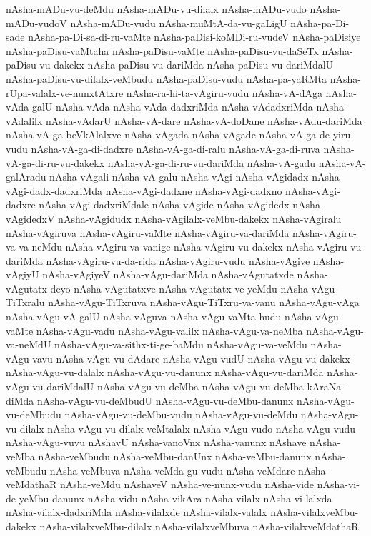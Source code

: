 {nAsha-mADu-vu-deMdu
nAsha-mADu-vu-dilalx
nAsha-mADu-vudo
nAsha-mADu-vudoV
nAsha-mADu-vudu
nAsha-muMtA-da-vu-gaLigU
nAsha-pa-Di-sade
nAsha-pa-Di-sa-di-ru-vaMte
nAsha-paDisi-koMDi-ru-vudeV
nAsha-paDisiye
nAsha-paDisu-vaMtaha
nAsha-paDisu-vaMte
nAsha-paDisu-vu-daSeTx
nAsha-paDisu-vu-dakekx
nAsha-paDisu-vu-dariMda
nAsha-paDisu-vu-dariMdalU
nAsha-paDisu-vu-dilalx-veMbudu
nAsha-paDisu-vudu
nAsha-pa-yaRMta
nAsha-rUpa-valalx-ve-nunxtAtxre
nAsha-ra-hi-ta-vAgiru-vudu
nAsha-vA-dAga
nAsha-vAda-galU
nAsha-vAda
nAsha-vAda-dadxriMda
nAsha-vAdadxriMda
nAsha-vAdalilx
nAsha-vAdarU
nAsha-vA-dare
nAsha-vA-doDane
nAsha-vAdu-dariMda
nAsha-vA-ga-beVkAlalxve
nAsha-vAgada
nAsha-vAgade
nAsha-vA-ga-de-yiru-vudu
nAsha-vA-ga-di-dadxre
nAsha-vA-ga-di-ralu
nAsha-vA-ga-di-ruva
nAsha-vA-ga-di-ru-vu-dakekx
nAsha-vA-ga-di-ru-vu-dariMda
nAsha-vA-gadu
nAsha-vA-galAradu
nAsha-vAgali
nAsha-vA-galu
nAsha-vAgi
nAsha-vAgidadx
nAsha-vAgi-dadx-dadxriMda
nAsha-vAgi-dadxne
nAsha-vAgi-dadxno
nAsha-vAgi-dadxre
nAsha-vAgi-dadxriMdale
nAsha-vAgide
nAsha-vAgidedx
nAsha-vAgidedxV
nAsha-vAgidudx
nAsha-vAgilalx-veMbu-dakekx
nAsha-vAgiralu
nAsha-vAgiruva
nAsha-vAgiru-vaMte
nAsha-vAgiru-va-dariMda
nAsha-vAgiru-va-va-neMdu
nAsha-vAgiru-va-vanige
nAsha-vAgiru-vu-dakekx
nAsha-vAgiru-vu-dariMda
nAsha-vAgiru-vu-da-rida
nAsha-vAgiru-vudu
nAsha-vAgive
nAsha-vAgiyU
nAsha-vAgiyeV
nAsha-vAgu-dariMda
nAsha-vAgutatxde
nAsha-vAgutatx-deyo
nAsha-vAgutatxve
nAsha-vAgutatx-ve-yeMdu
nAsha-vAgu-TiTxralu
nAsha-vAgu-TiTxruva
nAsha-vAgu-TiTxru-va-vanu
nAsha-vAgu-vAga
nAsha-vAgu-vA-galU
nAsha-vAguva
nAsha-vAgu-vaMta-hudu
nAsha-vAgu-vaMte
nAsha-vAgu-vadu
nAsha-vAgu-valilx
nAsha-vAgu-va-neMba
nAsha-vAgu-va-neMdU
nAsha-vAgu-va-sithx-ti-ge-baMdu
nAsha-vAgu-va-veMdu
nAsha-vAgu-vavu
nAsha-vAgu-vu-dAdare
nAsha-vAgu-vudU
nAsha-vAgu-vu-dakekx
nAsha-vAgu-vu-dalalx
nAsha-vAgu-vu-danunx
nAsha-vAgu-vu-dariMda
nAsha-vAgu-vu-dariMdalU
nAsha-vAgu-vu-deMba
nAsha-vAgu-vu-deMba-kAraNa-diMda
nAsha-vAgu-vu-deMbudU
nAsha-vAgu-vu-deMbu-danunx
nAsha-vAgu-vu-deMbudu
nAsha-vAgu-vu-deMbu-vudu
nAsha-vAgu-vu-deMdu
nAsha-vAgu-vu-dilalx
nAsha-vAgu-vu-dilalx-veMtalalx
nAsha-vAgu-vudo
nAsha-vAgu-vudu
nAsha-vAgu-vuvu
nAshavU
nAsha-vanoVnx
nAsha-vanunx
nAshave
nAsha-veMba
nAsha-veMbudu
nAsha-veMbu-danUnx
nAsha-veMbu-danunx
nAsha-veMbudu
nAsha-veMbuva
nAsha-veMda-gu-vudu
nAsha-veMdare
nAsha-veMdathaR
nAsha-veMdu
nAshaveV
nAsha-ve-nunx-vudu
nAsha-vide
nAsha-vi-de-yeMbu-danunx
nAsha-vidu
nAsha-vikAra
nAsha-vilalx
nAsha-vi-lalxda
nAsha-vilalx-dadxriMda
nAsha-vilalxde
nAsha-vilalx-valalx
nAsha-vilalxveMbu-dakekx
nAsha-vilalxveMbu-dilalx
nAsha-vilalxveMbuva
nAsha-vilalxveMdathaR
}
